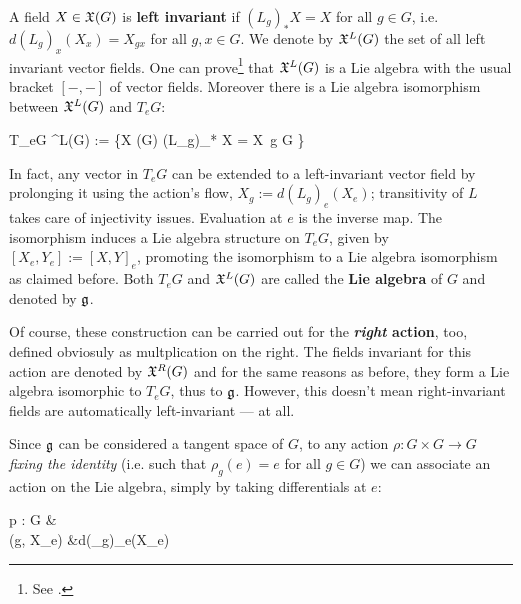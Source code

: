 \documentclass[main.tex]{subfiles}
\begin{document}
A field $X \in \mathfrak{X}(G)$ is \textbf{left invariant} if $(L_g)_*X = X$ for all $g \in G$, i.e. $d(L_g)_x(X_x) = X_{gx}$ for all $g,x \in G$. We denote by $\mathfrak{X}^L(G)$ the set of all left invariant vector fields. 
One can prove\footnote{See \cite[Proposition 3.6.2]{abate2011geometria}.} that $\mathfrak{X}^L(G)$ is a Lie algebra with the usual bracket $[-,-]$ of vector fields. Moreover there is a Lie algebra isomorphism between $\mathfrak{X}^L(G)$ and $T_eG$:
\begin{eqalign}
	T_eG \iso \fields^L(G) := \{X \in \fields(G) \suchthat (L_g)_* X = X\ \forall g \in G \}
\end{eqalign}
In fact, any vector in $T_e G$ can be extended to a left-invariant vector field by prolonging it using the action's flow, $X_g := d(L_g)_e(X_e)$; transitivity of $L$ takes care of injectivity issues. Evaluation at $e$ is the inverse map. The isomorphism induces a Lie algebra structure on $T_eG$, given by $[X_e, Y_e] := [X,Y]_e$, promoting the isomorphism to a Lie algebra isomorphism as claimed before. Both $T_eG$ and $\mathfrak{X}^L(G)$ are called the \textbf{Lie algebra} of $G$ and denoted by $\mathfrak g$. 

Of course, these construction can be carried out for the \textbf{\emph{right} action}, too, defined obviosuly as multplication on the right. The fields invariant for this action are denoted by $\mathfrak{X}^R(G)$ and for the same reasons as before, they form a Lie algebra isomorphic to $T_e G$, thus to $\mathfrak g$. However, this doesn't mean right-invariant fields are automatically left-invariant --- at all.

Since $\mathfrak g$ can be considered a tangent space of $G$, to any action $\rho : G \times G \to G$ \emph{fixing the identity} (i.e. such that $\rho_g (e) = e$ for all $g \in G$) we can associate an action on the Lie algebra, simply by taking differentials at $e$:
\begin{eqalign}
	\mathfrak p : G \times \lalg &\longto \lalg\\
		(g, X_e) &\longmapsto d(\rho_g)_e(X_e)
\end{eqalign}
\end{document}
